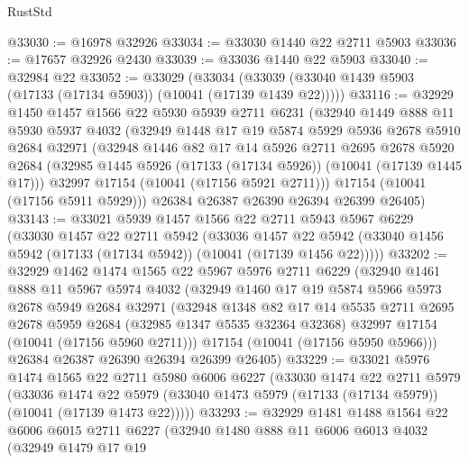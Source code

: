 \begin{lexlean}{RustStd}
\begin{coremodule}
@33030 := @16978 @32926
@33034 := @33030 @1440 @22 @2711 @5903
@33036 := @17657 @32926 @2430
@33039 := @33036 @1440 @22 @5903
@33040 := @32984 @22
@33052 := @33029
    (@33034 (@33039 (@33040 @1439 @5903 (@17133 (@17134 @5903)) (@10041 (@17139 @1439 @22)))))
@33116 := @32929
    @1450
    @1457
    @1566
    @22
    @5930
    @5939
    @2711
    @6231
    (@32940
      @1449
      @888
      @11
      @5930
      @5937
      @4032
      (@32949
        @1448
        @17
        @19
        @5874
        @5929
        @5936
        @2678
        @5910
        @2684
        @32971
        (@32948
          @1446
          @82
          @17
          @14
          @5926
          @2711
          @2695
          @2678
          @5920
          @2684
          (@32985 @1445 @5926 (@17133 (@17134 @5926)) (@10041 (@17139 @1445 @17)))
          @32997
          @17154
          (@10041 (@17156 @5921 @2711)))
        @17154
        (@10041 (@17156 @5911 @5929)))
      @26384
      @26387
      @26390
      @26394
      @26399
      @26405)
@33143 := @33021
    @5939
    @1457
    @1566
    @22
    @2711
    @5943
    @5967
    @6229
    (@33030
      @1457
      @22
      @2711
      @5942
      (@33036
        @1457
        @22
        @5942
        (@33040 @1456 @5942 (@17133 (@17134 @5942)) (@10041 (@17139 @1456 @22)))))
@33202 := @32929
    @1462
    @1474
    @1565
    @22
    @5967
    @5976
    @2711
    @6229
    (@32940
      @1461
      @888
      @11
      @5967
      @5974
      @4032
      (@32949
        @1460
        @17
        @19
        @5874
        @5966
        @5973
        @2678
        @5949
        @2684
        @32971
        (@32948
          @1348
          @82
          @17
          @14
          @5535
          @2711
          @2695
          @2678
          @5959
          @2684
          (@32985 @1347 @5535 @32364 @32368)
          @32997
          @17154
          (@10041 (@17156 @5960 @2711)))
        @17154
        (@10041 (@17156 @5950 @5966)))
      @26384
      @26387
      @26390
      @26394
      @26399
      @26405)
@33229 := @33021
    @5976
    @1474
    @1565
    @22
    @2711
    @5980
    @6006
    @6227
    (@33030
      @1474
      @22
      @2711
      @5979
      (@33036
        @1474
        @22
        @5979
        (@33040 @1473 @5979 (@17133 (@17134 @5979)) (@10041 (@17139 @1473 @22)))))
@33293 := @32929
    @1481
    @1488
    @1564
    @22
    @6006
    @6015
    @2711
    @6227
    (@32940
      @1480
      @888
      @11
      @6006
      @6013
      @4032
      (@32949
        @1479
        @17
        @19

\end{coremodule}
\end{lexlean}
